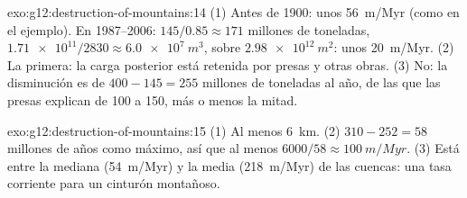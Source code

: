 \begin{solution}{exo:g12:destruction-of-mountains:14}
(1) Antes de 1900: unos \qty{56}{m/Myr} (como en el ejemplo). En
1987--2006: $145/0.85 \approx 171$ millones de toneladas, $\num{1.71e11}/2830
\approx \qty{6.0e7}{m^3}$, sobre $\qty{2.98e12}{m^2}$: unos
\qty{20}{m/Myr}. (2) La primera: la carga posterior está retenida por presas
y otras obras. (3) No: la disminución es de $400 - 145 = 255$ millones de
toneladas al año, de las que las presas explican de 100 a 150, más o menos la
mitad.
\end{solution}

\begin{solution}{exo:g12:destruction-of-mountains:15}
(1) Al menos \qty{6}{km}. (2) $310 - 252 = 58$ millones de años como máximo,
así que al menos $6000/58 \approx \qty{100}{m/Myr}$. (3) Está entre la
mediana (\qty{54}{m/Myr}) y la media (\qty{218}{m/Myr}) de las cuencas: una
tasa corriente para un cinturón montañoso.
\end{solution}

